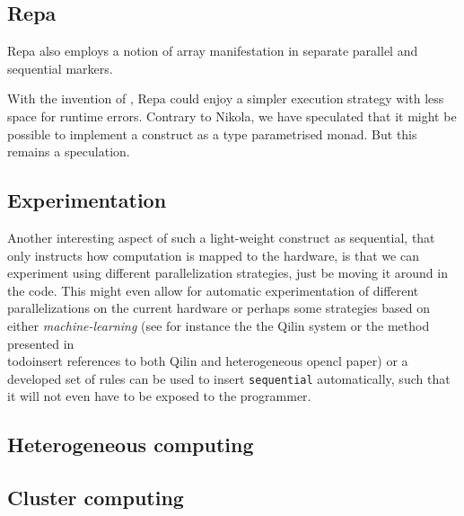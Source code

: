 \subsection{Repa}

Repa also employs a notion of array manifestation in separate parallel and
sequential markers.

With the invention of , Repa could enjoy a simpler
execution strategy with less space for runtime errors.  Contrary to Nikola, we
have speculated that it might be possible to implement a
 construct as a type parametrised monad. But this
remains a speculation.

\subsection{Experimentation}
Another interesting aspect of such a light-weight construct as
sequential, that only instructs how computation is mapped to the
hardware, is that we can experiment using different parallelization
strategies, just be moving it around in the code. This might even
allow for automatic experimentation of different parallelizations on
the current hardware or perhaps some strategies based on either
\emph{machine-learning} (see for instance the the Qilin system or the
method presented in \\todo{insert references to both Qilin and
  heterogeneous opencl paper}) or a developed set of rules can be used
to insert \lstinline{sequential} automatically, such that it will not
even have to be exposed to the programmer.

\subsection{Heterogeneous computing}

\subsection{Cluster computing}



